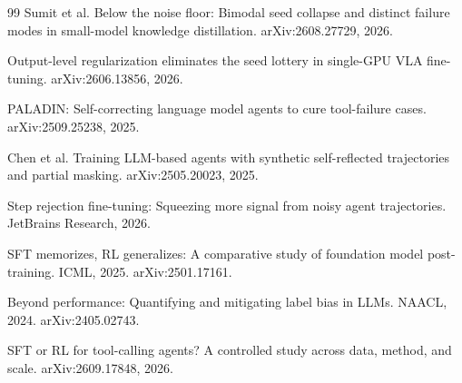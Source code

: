 \documentclass[11pt]{article}
\begin{document}
\begin{thebibliography}{99}
Sumit et al. Below the noise floor: Bimodal seed collapse and distinct failure
modes in small-model knowledge distillation. arXiv:2608.27729, 2026.

Output-level regularization eliminates the seed lottery in single-GPU VLA
fine-tuning. arXiv:2606.13856, 2026.

PALADIN: Self-correcting language model agents to cure tool-failure cases.
arXiv:2509.25238, 2025.

Chen et al. Training LLM-based agents with synthetic self-reflected trajectories
and partial masking. arXiv:2505.20023, 2025.

Step rejection fine-tuning: Squeezing more signal from noisy agent trajectories.
JetBrains Research, 2026.

SFT memorizes, RL generalizes: A comparative study of foundation model
post-training. ICML, 2025. arXiv:2501.17161.

Beyond performance: Quantifying and mitigating label bias in LLMs. NAACL, 2024.
arXiv:2405.02743.

SFT or RL for tool-calling agents? A controlled study across data, method, and
scale. arXiv:2609.17848, 2026.
\end{thebibliography}
\end{document}
